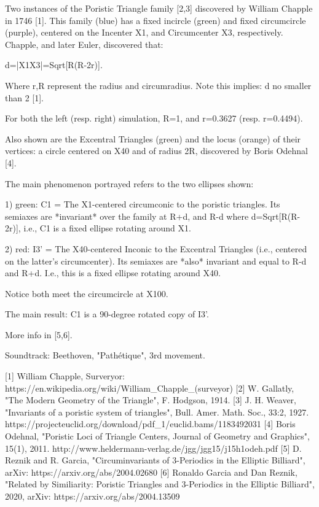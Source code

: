 Two instances of the Poristic Triangle family [2,3] discovered by William Chapple in 1746 [1]. This family (blue) has a fixed incircle (green) and fixed circumcircle (purple), centered on the Incenter X1, and Circumcenter X3, respectively. Chapple, and later Euler, discovered that:

d=|X1X3|=Sqrt[R(R-2r)].

Where r,R represent the radius and circumradius. Note this implies: d no smaller than 2 [1].

For both the left (resp. right) simulation, R=1, and  r=0.3627 (resp. r=0.4494).

Also shown are the Excentral Triangles (green) and the locus (orange) of their vertices: a circle centered on X40 and of radius 2R, discovered by Boris Odehnal [4].

The main phenomenon portrayed refers to the two ellipses shown:

1) green: C1 = The X1-centered circumconic to the poristic triangles. Its semiaxes are *invariant* over the family at R+d, and R-d where d=Sqrt[R(R-2r)], i.e., C1 is a fixed ellipse rotating around X1.

2) red: I3' = The X40-centered Inconic to the Excentral Triangles (i.e., centered on the latter's circumcenter). Its semiaxes are *also* invariant and equal to R-d and R+d. I.e., this is a fixed ellipse rotating around X40.

Notice both meet the circumcircle at X100. 

The main result: C1 is a 90-degree rotated copy of I3'.

More info in [5,6].

Soundtrack: Beethoven, "Pathétique", 3rd movement.

[1] William Chapple, Surveryor: https://en.wikipedia.org/wiki/William_Chapple_(surveyor)
[2] W. Gallatly, "The Modern Geometry of the Triangle", F. Hodgson, 1914.
[3] J. H. Weaver, "Invariants of a poristic system of triangles", Bull. Amer. Math. Soc., 33:2, 1927. https://projecteuclid.org/download/pdf_1/euclid.bams/1183492031
[4] Boris Odehnal, "Poristic Loci of Triangle Centers, Journal of Geometry and Graphics", 15(1), 2011. http://www.heldermann-verlag.de/jgg/jgg15/j15h1odeh.pdf
[5] D. Reznik and R. Garcia, "Circuminvariants of 3-Periodics in the Elliptic Billiard", arXiv: https://arxiv.org/abs/2004.02680
[6] Ronaldo Garcia and Dan Reznik, "Related by Similiarity: Poristic Triangles and 3-Periodics in the Elliptic Billiard", 2020, arXiv: https://arxiv.org/abs/2004.13509